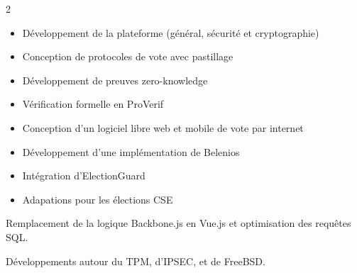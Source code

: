 \documentclass[10pt,a4paper,withhyper]{altacv}
\begin{document}
\begin{paracol}{2}

\begin{itemize}
\item Développement de la plateforme (général, sécurité et cryptographie)
\end{itemize}

\divider

\begin{itemize}
\item Conception de protocoles de vote avec pastillage
\item Développement de preuves zero-knowledge
\item Vérification formelle en ProVerif
\end{itemize}

\divider

\begin{itemize}
\item Conception d'un logiciel libre web et mobile de vote par internet
\item Développement d'une implémentation de Belenios
\end{itemize}

\divider

\begin{itemize}
\item Intégration d'ElectionGuard
\item Adapations pour les élections CSE
\end{itemize}

\divider

Remplacement de la logique Backbone.js en Vue.js et optimisation des requêtes SQL.

\divider

Développements autour du TPM, d'IPSEC, et de FreeBSD.


\end{paracol}
\end{document}
